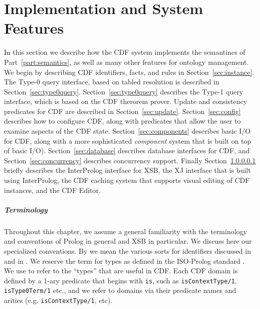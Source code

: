 \chapter{Implementation and System Features} \label{sec:impl}

In this section we describe how the CDF system implements the
semantincs of Part~\ref{part:semantics}, as well as many other
features for ontology management.  We begin by describing CDF
identifiers, facts, and rules in Section~\ref{sec:instance}.  The
Type-0 query interface, based on tabled resolution is described in
Section~\ref{sec:type0query}.  Section~\ref{sec:type0query} describes
the Type-1 query interface, which is based on the CDF therorem prover.
Update and consistency predicates for CDF are described in
Section~\ref{sec:update}.  Section~\ref{sec:config} describes how to
configure CDF, along with predicates that allow the user to examine
aspects of the CDF state.  Section~\ref{sec:components} describes
basic I/O for CDF, along with a more sophisticated {\em component}
system that is built on top of basic I/O).  Section~\ref{sec:database}
describes database interfaces for CDF, and
Section~\ref{sec:concurrency} describes concurrency support.  Finally
Section~\ref{} briefly describes the InterProlog interface for XSB,
the XJ interface that is built using InterProlog, the CDF caching
system that supports visual editing of CDF instances, and the CDF
Editor.

\paragraph{Terminology}
Throughout this chapter, we assume a general familiarity with the
terminology and conventions of Prolog in general and XSB in
particular.  We discuss here our specialized conventions.  By
 we mean the various sorts for identifiers discussed in
 and in .  We reserve the term
 for types as defined in the ISO-Prolog standard
\cite{ISO}.  We use  to refer to the ``types'' that are
useful in CDF.  Each CDF domain is defined by a 1-ary predicate that
begins with {\tt is}, such as {\tt isContextType/1}, {\tt
isType0Term/1} etc., and we refer to domains via their predicate names
and arities (e.g. {\tt isContextType/1}, etc).


 








